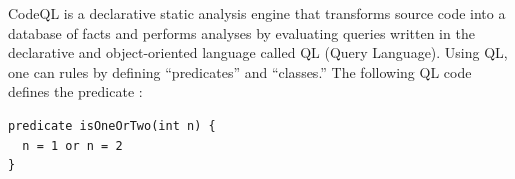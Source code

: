 CodeQL is a declarative static analysis engine that transforms source code into
a database of facts and performs analyses by evaluating queries written in the
declarative and object-oriented language called QL (Query Language). Using QL,
one can  rules by defining ``predicates'' and ``classes.'' The following
QL code defines the  predicate :

\begin{lstlisting}[style=codeql,xleftmargin=2.5em]
predicate isOneOrTwo(int n) {
  n = 1 or n = 2
}
\end{lstlisting}

\noindent
{}

